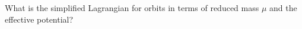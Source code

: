 

\vspace*{\fill}
\centering

What is the simplified Lagrangian for orbits in terms of reduced mass $\mu$ and the effective potential?

\centering
\vspace*{\fill}

